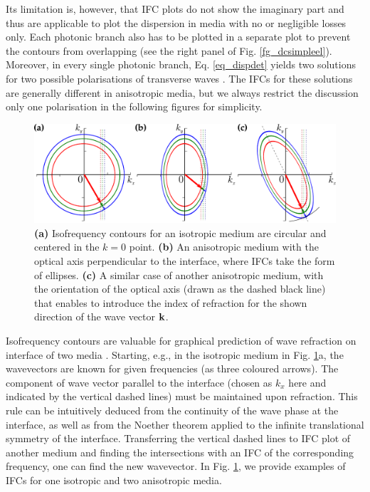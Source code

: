Its limitation is, however, that IFC plots do not show the imaginary part and thus are applicable to plot the dispersion in media with no or negligible losses only.  
Each photonic branch also has to be plotted in a separate plot to prevent the contours from overlapping (see the right panel of Fig. \ref{fg_dcsimpleel}). 
Moreover, in every single photonic branch, Eq. \ref{eq_dispdet} yields two solutions for two possible polarisations of transverse waves \cite[p. 46]{klingshirn2007semiconductor}. The IFCs for these solutions are generally different in anisotropic media, but we always restrict the discussion only one polarisation in the following figures  for simplicity. %

\begin{figure}[ht] \caption{\textbf{(a)} Isofrequency contours for an isotropic medium are circular and centered in the $k=0$ point.  
		\textbf{(b)} An anisotropic medium with the optical axis perpendicular to the interface, where IFCs take the form of ellipses. \textbf{(c)} A similar case of another anisotropic medium, with the orientation of the optical axis (drawn as the dashed black line) that enables to introduce the index of refraction for the shown direction of the wave vector ${\mathbf{k}}$.
} \label{fg_ifc} \centering  %
	\includegraphics[width=.8\textwidth]{img/ifc_freqdispersion.pdf} 
\end{figure}
Isofrequency contours are valuable for graphical prediction of wave refraction on interface of two media \cite[p. 118]{shalaev2010book}. Starting, e.g., in the isotropic medium in Fig. \ref{fg_ifc}a, the wavevectors are known for given frequencies (as three coloured arrows).
The component of wave vector parallel to the interface (chosen as $k_x$ here and indicated by the vertical dashed lines) must be maintained upon refraction. This rule can be intuitively deduced from the continuity of the wave phase at the interface, as well as from the Noether theorem applied to the infinite translational symmetry of the interface. Transferring the vertical dashed lines to IFC plot of another medium and finding the intersections with an IFC of the corresponding frequency, one can find the new wavevector. 
In Fig. \ref{fg_ifc}, we provide examples of IFCs for one isotropic and two anisotropic media.

